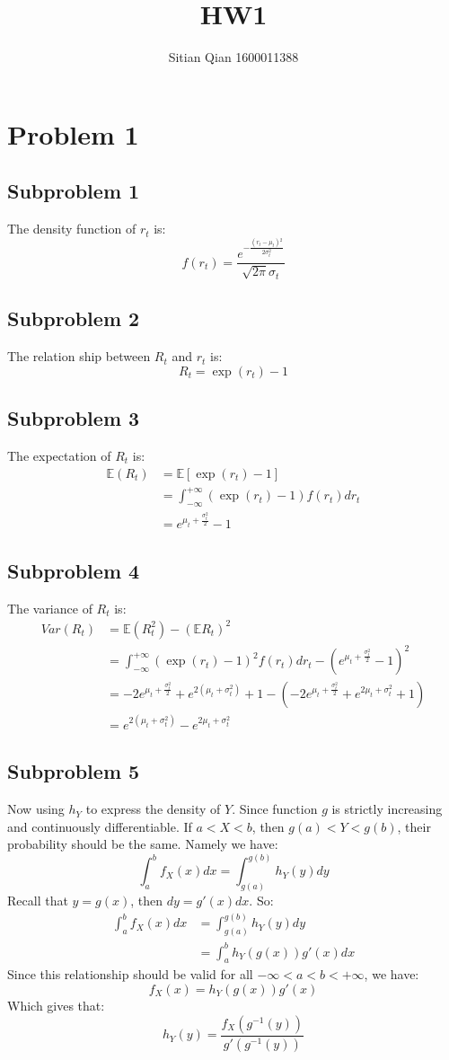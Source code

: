 \documentclass{article}
\theoremstyle{break}
\begin{document}
    \title{HW1}
    \author{Sitian Qian 1600011388}
    \maketitle
    \section{Problem 1}
    \subsection{Subproblem 1}
    The density function of $r_t$ is:
    $$f(r_t)=\frac{e^{-\frac{\left(r_t-\mu _t\right){}^2}{2 \sigma _t^2}}}{\sqrt{2 \pi } \sigma _t}$$
    \subsection{Subproblem 2}
    The relation ship between $R_t$ and $r_t$ is:
    $$R_t=\exp{(r_t)}-1$$
    \subsection{Subproblem 3}
    The expectation of $R_t$ is:
    \begin{align*}
        \mathbb{E}(R_t)&=\mathbb{E}[\exp(r_t)-1]\\
        &=\int_{-\infty}^{+\infty}(\exp(r_t)-1)f(r_t)dr_t\\
        &=e^{\mu _t+\frac{\sigma _t^2}{2}}-1
    \end{align*}
    \subsection{Subproblem 4}
    The variance of $R_t$ is:
    \begin{align*}
        Var(R_t)&=\mathbb{E}(R_t^2)-(\mathbb{E}R_t)^2\\
        &=\int_{-\infty}^{+\infty}(\exp(r_t)-1)^2f(r_t)dr_t-(e^{\mu _t+\frac{\sigma _t^2}{2}}-1)^2\\
        &=-2 e^{\mu _t+\frac{\sigma _t^2}{2}}+e^{2 \left(\mu _t+\sigma _t^2\right)}+1-(-2 e^{\mu _t+\frac{\sigma _t^2}{2}}+e^{2 \mu _t+\sigma _t^2}+1)\\
        &=e^{2 \left(\mu _t+\sigma _t^2\right)}-e^{2 \mu _t+\sigma _t^2}
    \end{align*}
    \subsection{Subproblem 5}
    Now using $h_Y$ to express the density of $Y$. Since function $g$ is strictly increasing and continuously differentiable. If $a<X<b$, then $g(a)<Y<g(b)$, their probability should be the same. Namely we have:
    $$\int_a^bf_X(x)dx=\int_{g(a)}^{g(b)}h_Y(y)dy$$
    Recall that $y=g(x)$, then $dy=g'(x)dx$. So:
    \begin{align*}
        \int_a^bf_X(x)dx&=\int_{g(a)}^{g(b)}h_Y(y)dy\\
        &=\int_a^bh_Y(g(x))g'(x)dx
    \end{align*}
    Since this relationship should be valid for all $-\infty<a<b<+\infty$, we have:
    $$f_X(x)=h_Y(g(x))g'(x)$$
    Which gives that:
    $$h_Y(y)=\frac{f_X(g^{-1}(y))}{g'(g^{-1}(y))}$$
\end{document}
